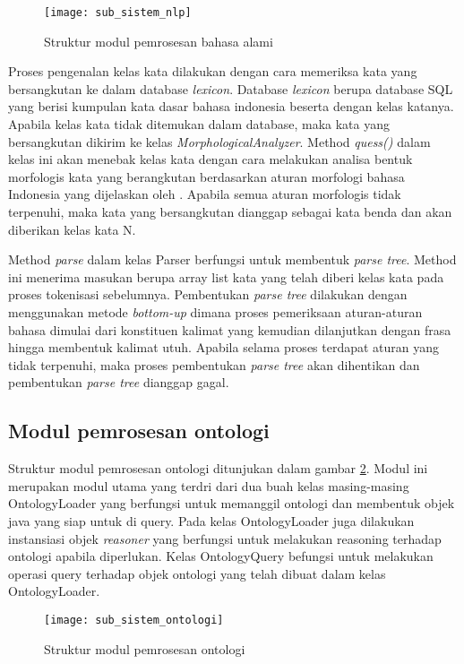\begin{figure}[ht]
    \centering
    \texttt{[image: sub\_sistem\_nlp]}
    \caption{Struktur modul pemrosesan bahasa alami} 
    \label{fig:sub_sistem_nlp}
\end{figure}

Proses pengenalan kelas kata dilakukan dengan cara memeriksa kata yang bersangkutan ke dalam database \emph{lexicon}. Database \emph{lexicon} berupa database SQL yang berisi kumpulan kata dasar bahasa indonesia beserta dengan kelas katanya. Apabila kelas kata tidak ditemukan dalam database, maka kata yang bersangkutan dikirim ke kelas \emph{MorphologicalAnalyzer}. Method \emph{quess()} dalam kelas ini akan menebak kelas kata dengan cara melakukan analisa bentuk morfologis kata yang berangkutan berdasarkan aturan morfologi bahasa Indonesia yang dijelaskan oleh \citet{alwi}. Apabila semua aturan morfologis tidak terpenuhi, maka kata yang bersangkutan dianggap sebagai kata benda dan akan diberikan kelas kata N.

Method \emph{parse} dalam kelas Parser berfungsi untuk membentuk \emph{parse tree}. Method ini menerima masukan berupa array list kata yang telah diberi kelas kata pada proses tokenisasi sebelumnya. Pembentukan \emph{parse tree} dilakukan dengan menggunakan metode \emph{bottom-up} dimana proses pemeriksaan aturan-aturan bahasa dimulai dari konstituen kalimat yang kemudian dilanjutkan dengan frasa hingga membentuk kalimat utuh. Apabila selama proses terdapat aturan yang tidak terpenuhi, maka proses pembentukan \emph{parse tree} akan dihentikan dan pembentukan \emph{parse tree} dianggap gagal.

\subsection{Modul pemrosesan ontologi}
Struktur modul pemrosesan ontologi ditunjukan dalam gambar \ref{fig:sub_sistem_ontologi}. Modul ini merupakan modul utama yang terdri dari dua buah kelas masing-masing OntologyLoader yang berfungsi untuk memanggil ontologi dan membentuk objek java yang siap untuk di query. Pada kelas OntologyLoader juga dilakukan instansiasi objek \emph{reasoner} yang berfungsi untuk melakukan reasoning terhadap ontologi apabila diperlukan. Kelas OntologyQuery befungsi untuk melakukan operasi query terhadap objek ontologi yang telah dibuat dalam kelas OntologyLoader.

\begin{figure}[ht]
    \centering
    \texttt{[image: sub\_sistem\_ontologi]}
    \caption{Struktur modul pemrosesan ontologi} 
    \label{fig:sub_sistem_ontologi}
\end{figure}

